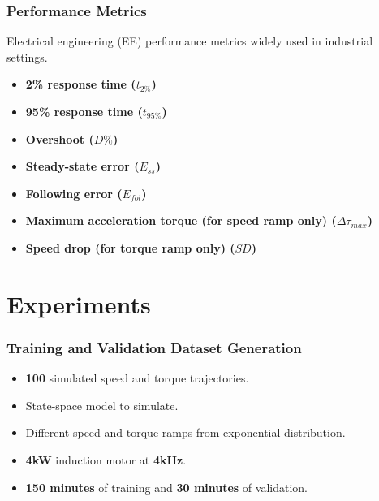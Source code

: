 \documentclass{beamer}
\begin{document}
\begin{frame}
\frametitle{Performance Metrics}
Electrical engineering (EE) performance metrics widely used in industrial settings.
\begin{itemize}
   \item \textbf{2\% response time ($t_{2\%}$)}
   \item \textbf{95\% response time ($t_{95\%}$)}
   \item \textbf{Overshoot ($D\%$)}
   \item \textbf{Steady-state error ($E_{ss}$)}
   \item \textbf{Following error ($E_{fol}$)}
   \item \textbf{Maximum acceleration torque (for speed ramp only) ($\Delta \tau_{max}$)}
   \item \textbf{Speed drop (for torque ramp only) ($SD$)}
\end{itemize}

\end{frame}


\section{Experiments}

\begin{frame}
\frametitle{Training and Validation Dataset Generation}
\begin{itemize}
    \item \textbf{100} simulated speed and torque trajectories.
    \item State-space model to simulate.
    \item Different speed and torque ramps from exponential distribution.
    \item \textbf{4kW} induction motor at \textbf{4kHz}.
    \item \textbf{150 minutes} of training and \textbf{30 minutes} of validation.
\end{itemize}

\end{frame}
\end{document}
